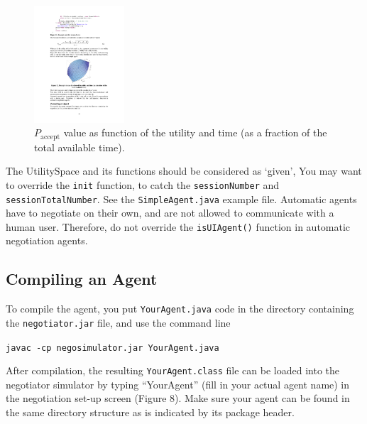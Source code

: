 \documentclass[]{article}
\begin{document}
\begin{figure}[htb]
	\centering
	\includegraphics[width=0.3\textwidth]{media/image21.pdf}
	\caption{$P_\text{accept}$ value as function of the utility and time (as a fraction of the total available time).}\label{Fig:Paccept}
\end{figure}
 
The UtilitySpace and its functions should be considered as `given',  
You may want to override the \texttt{init} function, to catch the \texttt{sessionNumber} and \texttt{sessionTotalNumber}. See the \texttt{SimpleAgent.java} example file.
Automatic agents have to negotiate on their own, and are not allowed to communicate with a human user. Therefore, do not override the \texttt{isUIAgent()} function in automatic negotiation agents.

\subsection{Compiling an Agent}

To compile the agent, you put \texttt{YourAgent.java} code in the directory containing the \texttt{negotiator.jar} file, and use the command line

\texttt{javac -cp negosimulator.jar YourAgent.java}

After compilation, the resulting \texttt{YourAgent.class} file can be loaded into the negotiator simulator by typing ``YourAgent'' (fill in your actual agent name) in the negotiation set-up screen (Figure 8). Make sure your agent can be found in the same directory structure as is indicated by its package header.
\end{document}
